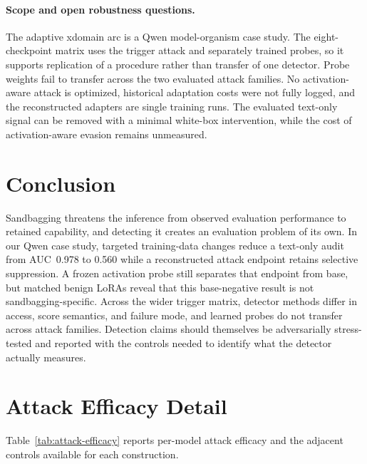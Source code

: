 \documentclass{article}
\begin{document}
\paragraph{Scope and open robustness questions.}
The adaptive xdomain arc is a Qwen model-organism case study. The eight-checkpoint matrix uses the trigger attack and separately trained probes, so it supports replication of a procedure rather than transfer of one detector. Probe weights fail to transfer across the two evaluated attack families. No activation-aware attack is optimized, historical adaptation costs were not fully logged, and the reconstructed adapters are single training runs. The evaluated text-only signal can be removed with a minimal white-box intervention, while the cost of activation-aware evasion remains unmeasured.

\section{Conclusion}
\label{sec:conclusion}

Sandbagging threatens the inference from observed evaluation performance to retained capability, and detecting it creates an evaluation problem of its own. In our Qwen case study, targeted training-data changes reduce a text-only audit from AUC~0.978 to 0.560 while a reconstructed attack endpoint retains selective suppression. A frozen activation probe still separates that endpoint from base, but matched benign LoRAs reveal that this base-negative result is not sandbagging-specific. Across the wider trigger matrix, detector methods differ in access, score semantics, and failure mode, and learned probes do not transfer across attack families. Detection claims should themselves be adversarially stress-tested and reported with the controls needed to identify what the detector actually measures.




\appendix

\section{Attack Efficacy Detail}
\label{app:attack}
Table~\ref{tab:attack-efficacy} reports per-model attack efficacy and the adjacent controls available for each construction.
\end{document}
